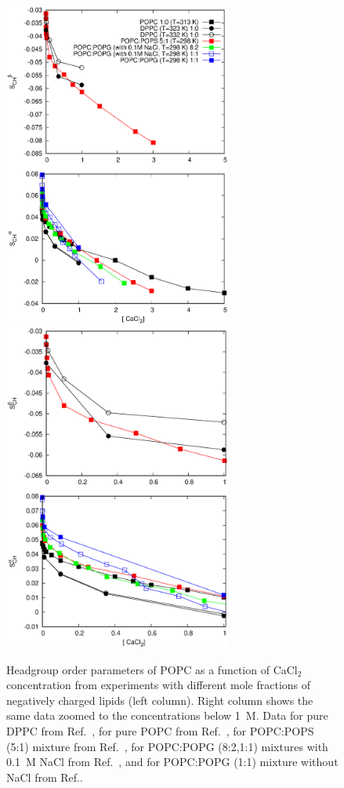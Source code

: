 \documentclass[journal=jpcbfk,manuscript=article]{achemso}
\begin{document}
\begin{figure}[t]
  \centering
  \includegraphics[width=7.5cm]{../Figs/LIPIDSwithCaCl.eps}
  \includegraphics[width=7.5cm]{../Figs/LIPIDSwithCaClBELOW1M.eps}
  \caption{\label{OrderParametersWithCaCl}
    Headgroup order parameters of POPC as a function of CaCl$_2$ concentration from experiments 
    with different mole fractions of negatively charged lipids (left column).
    Right column shows the same data zoomed to the concentrations below 1~M.
    Data for pure DPPC from Ref.~,
    for pure POPC from Ref.~, 
    for POPC:POPS (5:1) mixture from Ref.~,
    for POPC:POPG (8:2,1:1) mixtures with 0.1~M NaCl from Ref.~,
    and for POPC:POPG (1:1) mixture without NaCl from Ref..
  }
\end{figure}
\end{document}
